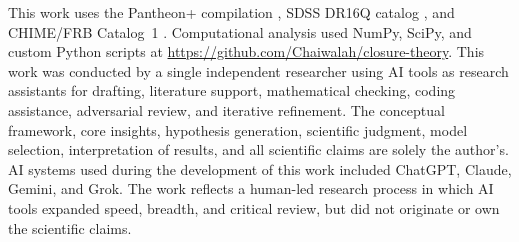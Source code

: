 \documentclass[twocolumn,showpacs,preprintnumbers,amsmath,amssymb,prl]{revtex4-2}
\begin{document}
\begin{acknowledgments}
This work uses the Pantheon+ compilation \citep{Scolnic2022,Brout2022}, SDSS DR16Q catalog \citep{Lyke2020}, and CHIME/FRB Catalog~1 \citep{CHIME2021}. Computational analysis used NumPy, SciPy, and custom Python scripts at \url{https://github.com/Chaiwalah/closure-theory}. This work was conducted by a single independent researcher using AI tools as research assistants for drafting, literature support, mathematical checking, coding assistance, adversarial review, and iterative refinement. The conceptual framework, core insights, hypothesis generation, scientific judgment, model selection, interpretation of results, and all scientific claims are solely the author's. AI systems used during the development of this work included ChatGPT, Claude, Gemini, and Grok. The work reflects a human-led research process in which AI tools expanded speed, breadth, and critical review, but did not originate or own the scientific claims.
\end{acknowledgments}


\end{document}
